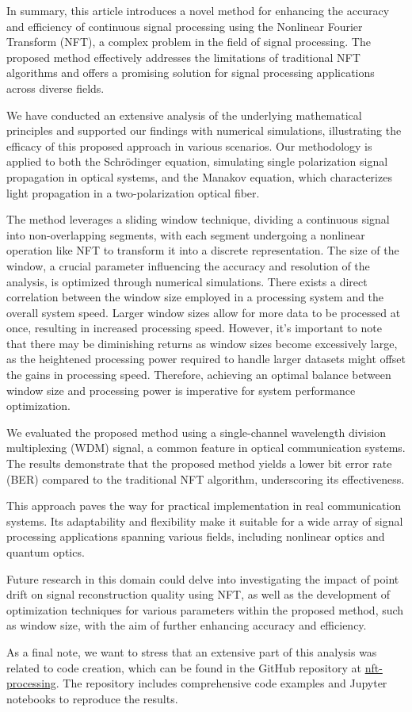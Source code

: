 In summary, this article introduces a novel method for enhancing the accuracy and efficiency of continuous signal processing using the Nonlinear Fourier Transform (NFT), a complex problem in the field of signal processing. The proposed method effectively addresses the limitations of traditional NFT algorithms and offers a promising solution for signal processing applications across diverse fields.

We have conducted an extensive analysis of the underlying mathematical principles and supported our findings with numerical simulations, illustrating the efficacy of this proposed approach in various scenarios. Our methodology is applied to both the Schr\"odinger equation, simulating single polarization signal propagation in optical systems, and the Manakov equation, which characterizes light propagation in a two-polarization optical fiber.

The method leverages a sliding window technique, dividing a continuous signal into non-overlapping segments, with each segment undergoing a nonlinear operation like NFT to transform it into a discrete representation. The size of the window, a crucial parameter influencing the accuracy and resolution of the analysis, is optimized through numerical simulations. There exists a direct correlation between the window size employed in a processing system and the overall system speed. Larger window sizes allow for more data to be processed at once, resulting in increased processing speed. However, it's important to note that there may be diminishing returns as window sizes become excessively large, as the heightened processing power required to handle larger datasets might offset the gains in processing speed. Therefore, achieving an optimal balance between window size and processing power is imperative for system performance optimization.

We evaluated the proposed method using a single-channel wavelength division multiplexing (WDM) signal, a common feature in optical communication systems. The results demonstrate that the proposed method yields a lower bit error rate (BER) compared to the traditional NFT algorithm, underscoring its effectiveness.

This approach paves the way for practical implementation in real communication systems. Its adaptability and flexibility make it suitable for a wide array of signal processing applications spanning various fields, including nonlinear optics and quantum optics.

Future research in this domain could delve into investigating the impact of point drift on signal reconstruction quality using NFT, as well as the development of optimization techniques for various parameters within the proposed method, such as window size, with the aim of further enhancing accuracy and efficiency.

As a final note, we want to stress that an extensive part of this analysis was related to code creation, which can be found in the GitHub repository at \href{https://github.com/esf0/nft-processing}{nft-processing}. The repository includes comprehensive code examples and Jupyter notebooks to reproduce the results.